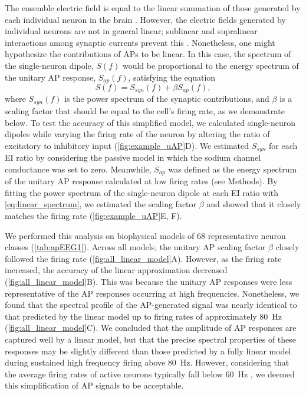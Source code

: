 The ensemble electric field is equal to the linear summation of those generated by each individual neuron in the brain \cite{Nunez2006, Malmivuo1995}. However, the electric fields generated by individual neurons are not in general linear; sublinear and supralinear interactions among synaptic currents prevent this \cite{Tran-Van-Minh2015}. Nonetheless, one might hypothesize the contributions of APs to be linear. In this case, the spectrum of the single-neuron dipole, $S(f)$ would be proportional to the energy spectrum of the unitary AP response, $S_{ap}(f)$, satisfying the equation
\begin{equation} \label{eq:linear_spectrum}
S(f) = S_{syn}(f) + \beta S_{ap}(f),
\end{equation}
where $S_{syn}(f)$ is the power spectrum of the synaptic contributions, and $\beta$ is a scaling factor that should be equal to the cell's firing rate, as we demonstrate below. To test the accuracy of this simplified model, we calculated single-neuron dipoles while varying the firing rate of the neuron by altering the ratio of excitatory to inhibitory input ({\autoref{fig:example_uAP}D}). We estimated $S_{syn}$ for each EI ratio by considering the passive model in which the sodium channel conductance was set to zero. Meanwhile, $S_{ap}$ was defined as the energy spectrum of the unitary AP response calculated at low firing rates (see Methods). By fitting the power spectrum of the single-neuron dipole at each EI ratio with {\ref{eq:linear_spectrum}}, we estimated the scaling factor $\beta$ and showed that it closely matches the firing rate ({\autoref{fig:example_uAP}E, F}). 

We performed this analysis on biophysical models of 68 representative neuron classes \cite{Markram2015} (\autoref{tab:apEEG1}). Across all models, the unitary AP scaling factor $\beta$ closely followed the firing rate ({\autoref{fig:all_linear_model}A}). However, as the firing rate increased, the accuracy of the linear approximation decreased ({\autoref{fig:all_linear_model}B}). This was because the unitary AP responses were less representative of the AP responses occurring at high frequencies. Nonetheless, we found that the spectral profile of the AP-generated signal was nearly identical to that predicted by the linear model up to firing rates of approximately 80~\unit{\hertz} ({\autoref{fig:all_linear_model}C}). We concluded that the amplitude of AP responses are captured well by a linear model, but that the precise spectral properties of these responses may be slightly different than those predicted by a fully linear model during sustained high frequency firing above 80~\unit{\hertz}. However, considering that the average firing rates of active neurons typically fall below \qty{60}{\hertz} \cite{Baddeley1997, Griffith1966, Shafi2007, OConnor2010}, we deemed this simplification of AP signals to be acceptable.

